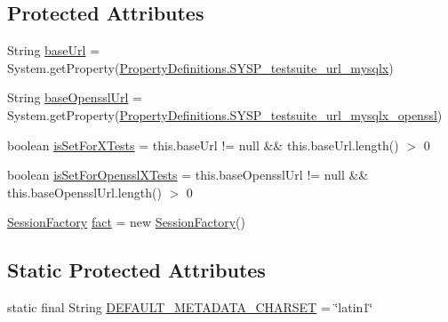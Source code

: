 \subsection*{Protected Attributes}
\begin{DoxyCompactItemize}
\item 
String \mbox{\hyperlink{classtestsuite_1_1x_1_1internal_1_1_internal_x_base_test_case_a0b0042b5d1e1bf1b7124abebff0396e5}{base\+Url}} = System.\+get\+Property(\mbox{\hyperlink{classcom_1_1mysql_1_1cj_1_1conf_1_1_property_definitions_a3952b559e0b2ffabf6b1c21eccd179e7}{Property\+Definitions.\+S\+Y\+S\+P\+\_\+testsuite\+\_\+url\+\_\+mysqlx}})
\item 
String \mbox{\hyperlink{classtestsuite_1_1x_1_1internal_1_1_internal_x_base_test_case_a6800502ed8f094f86e89e40a50c3da68}{base\+Openssl\+Url}} = System.\+get\+Property(\mbox{\hyperlink{classcom_1_1mysql_1_1cj_1_1conf_1_1_property_definitions_ac9827436f218e4b63f1f17fe18cdeb38}{Property\+Definitions.\+S\+Y\+S\+P\+\_\+testsuite\+\_\+url\+\_\+mysqlx\+\_\+openssl}})
\item 
boolean \mbox{\hyperlink{classtestsuite_1_1x_1_1internal_1_1_internal_x_base_test_case_abca8c335af0756fa3a8b63a2a4a5fcaa}{is\+Set\+For\+X\+Tests}} = this.\+base\+Url != null \&\& this.\+base\+Url.\+length() $>$ 0
\item 
boolean \mbox{\hyperlink{classtestsuite_1_1x_1_1internal_1_1_internal_x_base_test_case_a3f6e258d51d6cfd6639dea9404841846}{is\+Set\+For\+Openssl\+X\+Tests}} = this.\+base\+Openssl\+Url != null \&\& this.\+base\+Openssl\+Url.\+length() $>$ 0
\item 
\mbox{\hyperlink{classcom_1_1mysql_1_1cj_1_1xdevapi_1_1_session_factory}{Session\+Factory}} \mbox{\hyperlink{classtestsuite_1_1x_1_1internal_1_1_internal_x_base_test_case_aea4eb1d251b560a5be0d14fe49e15e29}{fact}} = new \mbox{\hyperlink{classcom_1_1mysql_1_1cj_1_1xdevapi_1_1_session_factory}{Session\+Factory}}()
\end{DoxyCompactItemize}
\subsection*{Static Protected Attributes}
\begin{DoxyCompactItemize}
\item 
static final String \mbox{\hyperlink{classtestsuite_1_1x_1_1internal_1_1_internal_x_base_test_case_a9bec716304323fdf5e6ecd55827e7c01}{D\+E\+F\+A\+U\+L\+T\+\_\+\+M\+E\+T\+A\+D\+A\+T\+A\+\_\+\+C\+H\+A\+R\+S\+ET}} = \char`\"{}latin1\char`\"{}
\end{DoxyCompactItemize}


